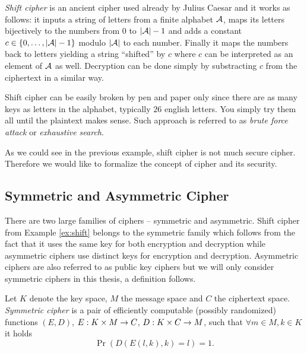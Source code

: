 \begin{example}
\label{ex:shift}
	{\em Shift cipher} is an ancient cipher used already by Julius Caesar and it works as follows: it inputs a string of letters from a finite alphabet $\cal A$, maps its letters bijectively to the numbers from $0$ to $|{\cal A}|-1$ and adds a constant $c\in\{0 , \ldots , |{\cal A}|-1\}$ modulo $|\cal A|$ to each number. Finally it maps the numbers back to letters yielding a string ``shifted'' by $c$ where $c$ can be interpreted as an element of $\cal A$ as well. Decryption can be done simply by substracting $c$ from the ciphertext in a similar way.
	
	Shift cipher can be easily broken by pen and paper only since there are as many keys as letters in the alphabet, typically $26$ english letters. You simply try them all until the plaintext makes sense. Such approach is referred to as {\em brute force attack} or {\em exhaustive search}.
\end{example}

As we could see in the previous example, shift cipher is not much secure cipher. Therefore we would like to formalize the concept of cipher and its security.


\subsection{Symmetric and Asymmetric Cipher}

There are two large families of ciphers -- symmetric and asymmetric. Shift cipher from Example \ref{ex:shift} belongs to the symmetric family which follows from the fact that it uses the same key for both encryption and decryption while asymmetric ciphers use distinct keys for encryption and decryption. Asymmetric ciphers are also referred to as public key ciphers but we will only consider symmetric ciphers in this thesis, a definition follows.

\begin{defn}
\label{def:symcipher}
	Let $K$ denote the key space, $M$ the message space and $C$ the ciphertext space. {\em Symmetric cipher} is a pair of efficiently computable (possibly randomized) functions $(E,D)$, $E:K\times M\rightarrow C$, $D:K\times C\rightarrow M$, such that $\forall m\in M, k\in K$ it holds
	\begin{equation}
		\Pr\left(D(E(l,k),k)=l\right) = 1 . \label{eq:correct}
	\end{equation}
\end{defn}

